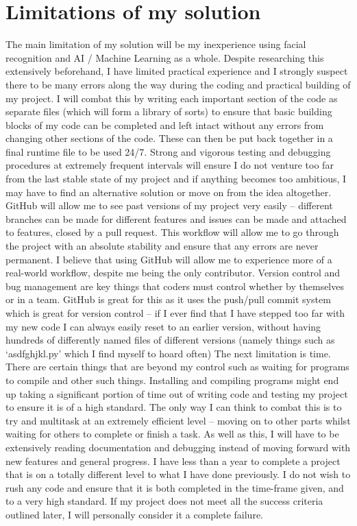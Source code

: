 \documentclass[9pt]{article}
\begin{document}
\section{Limitations of my solution}\label{sec_limitations}
The main limitation of my solution will be my inexperience using facial recognition and AI / Machine Learning as a whole. Despite researching this extensively beforehand, I have limited practical experience and I strongly suspect there to be many errors along the way during the coding and practical building of my project. I will combat this by writing each important section of the code as separate files (which will form a library of sorts) to ensure that basic building blocks of my code can be completed and left intact without any errors from changing other sections of the code. These can then be put back together in a final runtime file to be used 24/7. Strong and vigorous testing and debugging procedures at extremely frequent intervals will ensure I do not venture too far from the last stable state of my project and if anything becomes too ambitious, I may have to find an alternative solution or move on from the idea altogether. GitHub will allow me to see past versions of my project very easily – different branches can be made for different features and issues can be made and attached to features, closed by a pull request. This workflow will allow me to go through the project with an absolute stability and ensure that any errors are never permanent. I believe that using GitHub will allow me to experience more of a real-world workflow, despite me being the only contributor. Version control and bug management are key things that coders must control whether by themselves or in a team. GitHub is great for this as it uses the push/pull commit system which is great for version control – if I ever find that I have stepped too far with my new code I can always easily reset to an earlier version, without having hundreds of differently named files of different versions (namely things such as ‘asdfghjkl.py’ which I find myself to hoard often)
The next limitation is time. There are certain things that are beyond my control such as waiting for programs to compile and other such things. Installing and compiling programs might end up taking a significant portion of time out of writing code and testing my project to ensure it is of a high standard. The only way I can think to combat this is to try and multitask at an extremely efficient level – moving on to other parts whilst waiting for others to complete or finish a task. As well as this, I will have to be extensively reading documentation and debugging instead of moving forward with new features and general progress. I have less than a year to complete a project that is on a totally different level to what I have done previously. I do not wish to rush any code and ensure that it is both completed in the time-frame given, and to a very high standard. If my project does not meet all the success criteria outlined later, I will personally consider it a complete failure.
\end{document}
